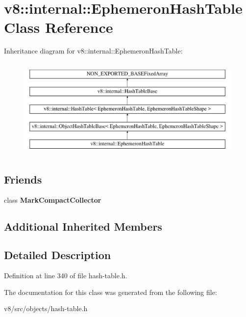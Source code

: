 \hypertarget{classv8_1_1internal_1_1EphemeronHashTable}{}\section{v8\+:\+:internal\+:\+:Ephemeron\+Hash\+Table Class Reference}
\label{classv8_1_1internal_1_1EphemeronHashTable}
Inheritance diagram for v8\+:\+:internal\+:\+:Ephemeron\+Hash\+Table\+:\begin{figure}[H]
\begin{center}
\leavevmode
\includegraphics[height=5.000000cm]{classv8_1_1internal_1_1EphemeronHashTable}
\end{center}
\end{figure}
\subsection*{Friends}
\begin{DoxyCompactItemize}
\item 
\mbox{\label{classv8_1_1internal_1_1EphemeronHashTable_ae585a96455613b2bc2ae3ea75a061d8b}} 
class {\bfseries Mark\+Compact\+Collector}
\end{DoxyCompactItemize}
\subsection*{Additional Inherited Members}


\subsection{Detailed Description}


Definition at line 340 of file hash-\/table.\+h.



The documentation for this class was generated from the following file\+:\begin{DoxyCompactItemize}
\item 
v8/src/objects/hash-\/table.\+h\end{DoxyCompactItemize}
